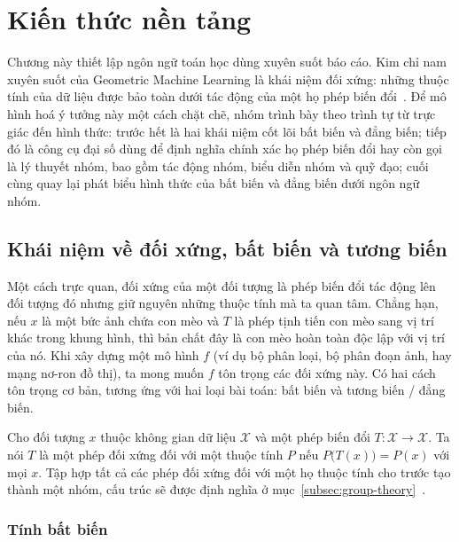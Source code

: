 \section{Kiến thức nền tảng}
\label{sec:kien-thuc-nen}
 
Chương này thiết lập ngôn ngữ toán học dùng xuyên suốt báo cáo. Kim chỉ nam xuyên suốt của Geometric Machine Learning là khái niệm đối xứng: những thuộc tính của dữ liệu được bảo toàn dưới tác động của một họ phép biến đổi~\cite{bronstein2021geometric}. Để mô hình hoá ý tưởng này một cách chặt chẽ, nhóm trình bày theo trình tự từ trực giác đến hình thức: trước hết là hai khái niệm cốt lõi bất biến và đẳng biến; tiếp đó là công cụ đại số dùng để định nghĩa chính xác họ phép biến đổi hay còn gọi là lý thuyết nhóm, bao gồm tác động nhóm, biểu diễn nhóm và quỹ đạo; cuối cùng quay lại phát biểu hình thức của bất biến và đẳng biến dưới ngôn ngữ nhóm.

\subsection{Khái niệm về đối xứng, bất biến và tương biến}
\label{subsec:doi-xung-bat-bien}
 
Một cách trực quan, đối xứng của một đối tượng là phép biến đổi tác động lên đối tượng đó nhưng giữ nguyên những thuộc tính mà ta quan tâm. Chẳng hạn, nếu $x$ là một bức ảnh chứa con mèo và $T$ là phép tịnh tiến con mèo sang vị trí khác trong khung hình, thì bản chất đây là con mèo hoàn toàn độc lập với vị trí của nó. Khi xây dựng một mô hình $f$ (ví dụ bộ phân loại, bộ phân đoạn ảnh, hay mạng nơ-ron đồ thị), ta mong muốn $f$ tôn trọng các đối xứng này. Có hai cách tôn trọng cơ bản, tương ứng với hai loại bài toán: bất biến và tương biến / đẳng biến.
 
\begin{definition}
\label{def:doi-xung}
Cho đối tượng $x$ thuộc không gian dữ liệu $\mathcal{X}$ và một phép biến đổi $T:\mathcal{X}\to\mathcal{X}$. Ta nói $T$ là một phép đối xứng đối với một thuộc tính $P$ nếu $P\bigl(T(x)\bigr)=P(x)$ với mọi $x$. Tập hợp tất cả các phép đối xứng đối với một họ thuộc tính cho trước tạo thành một nhóm, cấu trúc sẽ được định nghĩa ở mục~\ref{subsec:group-theory}~\cite{bronstein2021geometric}.
\end{definition}
 
\subsubsection{Tính bất biến}
\label{ssub:invariance}
 
